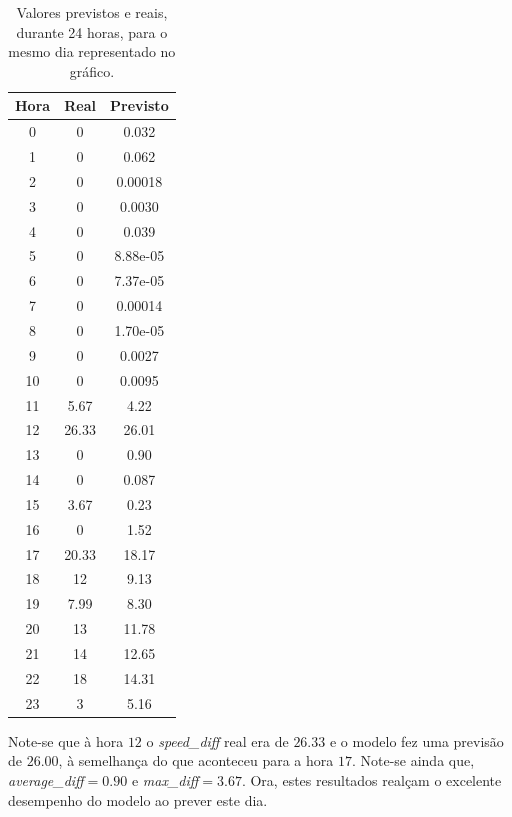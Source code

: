 \documentclass[a4paper, 12pt]{article}
\begin{document}
\begin{table}[H]
	\centering
	\begin{tabular}{||c||c|c||}
		\hline\hline
		Hora & Real&Previsto\\
		\hline\hline
		0 & 
0
 & 0.032 \\
		\hline
		1  &
0 & 0.062\\
		\hline
		2 & 0 & 0.00018	\\
		\hline
		3  & 
0
 & 0.0030\\
		\hline
		4 & 0
 &0.039 \\
		\hline
		5  & 0
 &8.88e-05 \\
		\hline
		6 & 0

 & 

7.37e-05 \\
		\hline
		7 & 
0
 & 0.00014\\
		\hline
		8  &
0 & 1.70e-05\\
		\hline
		9 &  0& 0.0027	\\
		\hline
		10 & 

0 &0.0095 \\
		\hline
		11  &
5.67 & 4.22\\
		\hline
		12 & 26.33 & 26.01	\\
		\hline
		13  & 
0
 &0.90\\
		\hline
		14 & 0
 &0.087 \\
		\hline
		15  & 
3.67 & 0.23\\
		\hline
		16 & 

0 & 
1.52
 \\
		\hline
		17 & 
20.33
 & 18.17 \\
		\hline
		18  &
12 & 9.13 \\
		\hline
		19 & 7.99 & 8.30	\\
		\hline
		20 & 
13
 &11.78 \\
		\hline
		21  &
14 &12.65 \\
		\hline
		22 & 18 & 14.31\\
		\hline
		23  & 3

 & 5.16\\
		\hline\hline
	\end{tabular}
\caption{Valores previstos e reais, durante 24 horas, para o mesmo dia representado no gráfico.}
\end{table}

Note-se que à hora $12$ o \textit{speed\_diff} real era de $26.33$ e o modelo fez uma previsão de $26.00$, à semelhança do que aconteceu para a hora $17$. Note-se ainda que, \textit{average\_diff}$=0.90$ e \textit{max\_diff}$=3.67$. Ora, estes resultados realçam o excelente desempenho do modelo ao prever este dia.
\end{document}
